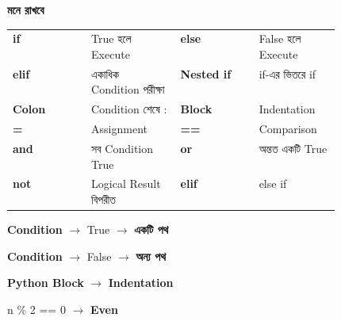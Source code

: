 \begin{rememberbox}

\textbf{\color{deepOrange}মনে রাখবে}

\begin{tabularx}
{\linewidth}
{
>{\bfseries\RaggedRight\arraybackslash}p{0.24\linewidth}
Y
>{\bfseries\RaggedRight\arraybackslash}p{0.24\linewidth}
Y
}

\textenglish{\ttfamily if}
&
True হলে Execute
&
\textenglish{\ttfamily else}
&
False হলে Execute
\\[0.7mm]

\textenglish{\ttfamily elif}
&
একাধিক Condition পরীক্ষা
&
Nested \textenglish{\ttfamily if}
&
\textenglish{\ttfamily if}-এর ভিতরে \textenglish{\ttfamily if}
\\[0.7mm]

Colon
&
Condition শেষে
\textenglish{\ttfamily :}
&
Block
&
Indentation
\\[0.7mm]

\textenglish{\ttfamily =}
&
Assignment
&
\textenglish{\ttfamily ==}
&
Comparison
\\[0.7mm]

\textenglish{\ttfamily and}
&
সব Condition True
&
\textenglish{\ttfamily or}
&
অন্তত একটি True
\\[0.7mm]

\textenglish{\ttfamily not}
&
Logical Result বিপরীত
&
\textenglish{\ttfamily elif}
&
else if
\\

\end{tabularx}

\medskip

\begin{center}

\textbf{Condition}
\(\longrightarrow\)
\textenglish{\ttfamily True}
\(\longrightarrow\)
\textbf{একটি পথ}

\qquad

\textbf{Condition}
\(\longrightarrow\)
\textenglish{\ttfamily False}
\(\longrightarrow\)
\textbf{অন্য পথ}

\medskip

\textbf{Python Block}
\(\longrightarrow\)
\textbf{Indentation}

\qquad

\textenglish{\ttfamily n \% 2 == 0}
\(\longrightarrow\)
\textbf{Even}

\end{center}

\end{rememberbox}

\small


